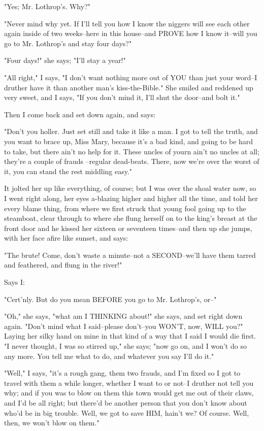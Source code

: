 "Yes; Mr. Lothrop's.  Why?"

"Never mind why yet.  If I'll tell you how I know the niggers will see
each other again inside of two weeks--here in this house--and PROVE how I
know it--will you go to Mr. Lothrop's and stay four days?"

"Four days!" she says; "I'll stay a year!"

"All right," I says, "I don't want nothing more out of YOU than just your
word--I druther have it than another man's kiss-the-Bible."  She smiled
and reddened up very sweet, and I says, "If you don't mind it, I'll shut
the door--and bolt it."

Then I come back and set down again, and says:

"Don't you holler.  Just set still and take it like a man.  I got to tell
the truth, and you want to brace up, Miss Mary, because it's a bad kind,
and going to be hard to take, but there ain't no help for it.  These
uncles of yourn ain't no uncles at all; they're a couple of frauds
--regular dead-beats.  There, now we're over the worst of it, you can stand
the rest middling easy."

It jolted her up like everything, of course; but I was over the shoal
water now, so I went right along, her eyes a-blazing higher and higher
all the time, and told her every blame thing, from where we first struck
that young fool going up to the steamboat, clear through to where she
flung herself on to the king's breast at the front door and he kissed her
sixteen or seventeen times--and then up she jumps, with her face afire
like sunset, and says:

"The brute!  Come, don't waste a minute--not a SECOND--we'll have them
tarred and feathered, and flung in the river!"

Says I:

"Cert'nly.  But do you mean BEFORE you go to Mr. Lothrop's, or--"

"Oh," she says, "what am I THINKING about!" she says, and set right down
again.  "Don't mind what I said--please don't--you WON'T, now, WILL you?"
Laying her silky hand on mine in that kind of a way that I said I would
die first.  "I never thought, I was so stirred up," she says; "now go on,
and I won't do so any more.  You tell me what to do, and whatever you say
I'll do it."

"Well," I says, "it's a rough gang, them two frauds, and I'm fixed so I
got to travel with them a while longer, whether I want to or not--I
druther not tell you why; and if you was to blow on them this town would
get me out of their claws, and I'd be all right; but there'd be another
person that you don't know about who'd be in big trouble.  Well, we got
to save HIM, hain't we?  Of course.  Well, then, we won't blow on them."


